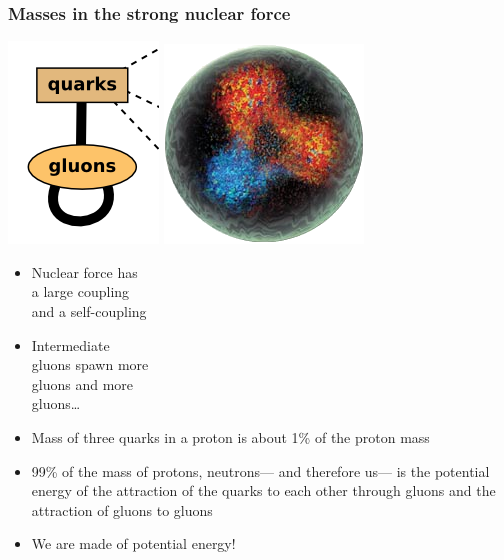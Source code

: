 \documentclass[compress]{beamer}
\begin{document}
\begin{frame}
\frametitle{Masses in the strong nuclear force}

\hfill \includegraphics[height=3 cm]{strong_force.png} \hspace{1 cm} \includegraphics[height=3 cm]{inside_proton.png}

\vspace{-3 cm}
\begin{itemize}
\item Nuclear force has \\
a large coupling \\
and a self-coupling

\item Intermediate \\
gluons spawn more \\
gluons and more \\
gluons\ldots

\item Mass of three quarks in a proton is about 1\% of the proton mass

\item 99\% of the mass of protons, neutrons--- and therefore us--- is the
  potential energy of the attraction of the quarks to each other
  through gluons and the attraction of gluons to gluons

\item We are made of potential energy!
\end{itemize}
\end{frame}
\end{document}
